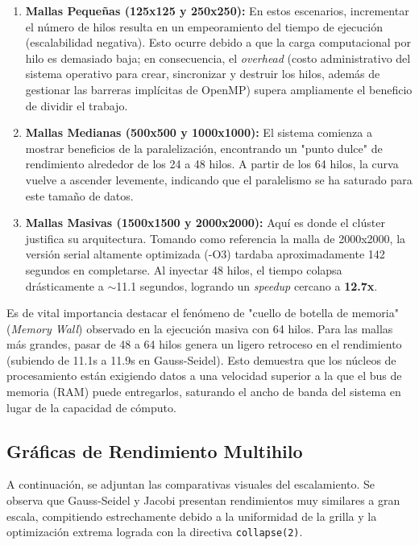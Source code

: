 \begin{enumerate}
    \item \textbf{Mallas Pequeñas (125x125 y 250x250):} En estos escenarios, incrementar el número de hilos resulta en un empeoramiento del tiempo de ejecución (escalabilidad negativa). Esto ocurre debido a que la carga computacional por hilo es demasiado baja; en consecuencia, el \textit{overhead} (costo administrativo del sistema operativo para crear, sincronizar y destruir los hilos, además de gestionar las barreras implícitas de OpenMP) supera ampliamente el beneficio de dividir el trabajo.
    
    \item \textbf{Mallas Medianas (500x500 y 1000x1000):} El sistema comienza a mostrar beneficios de la paralelización, encontrando un "punto dulce" de rendimiento alrededor de los 24 a 48 hilos. A partir de los 64 hilos, la curva vuelve a ascender levemente, indicando que el paralelismo se ha saturado para este tamaño de datos.
    
    \item \textbf{Mallas Masivas (1500x1500 y 2000x2000):} Aquí es donde el clúster justifica su arquitectura. Tomando como referencia la malla de 2000x2000, la versión serial altamente optimizada (-O3) tardaba aproximadamente 142 segundos en completarse. Al inyectar 48 hilos, el tiempo colapsa drásticamente a $\sim$11.1 segundos, logrando un \textit{speedup} cercano a \textbf{12.7x}. 
\end{enumerate}

Es de vital importancia destacar el fenómeno de "cuello de botella de memoria" (\textit{Memory Wall}) observado en la ejecución masiva con 64 hilos. Para las mallas más grandes, pasar de 48 a 64 hilos genera un ligero retroceso en el rendimiento (subiendo de 11.1s a 11.9s en Gauss-Seidel). Esto demuestra que los núcleos de procesamiento están exigiendo datos a una velocidad superior a la que el bus de memoria (RAM) puede entregarlos, saturando el ancho de banda del sistema en lugar de la capacidad de cómputo.

\subsection{Gráficas de Rendimiento Multihilo}

A continuación, se adjuntan las comparativas visuales del escalamiento. Se observa que Gauss-Seidel y Jacobi presentan rendimientos muy similares a gran escala, compitiendo estrechamente debido a la uniformidad de la grilla y la optimización extrema lograda con la directiva \texttt{collapse(2)}.

